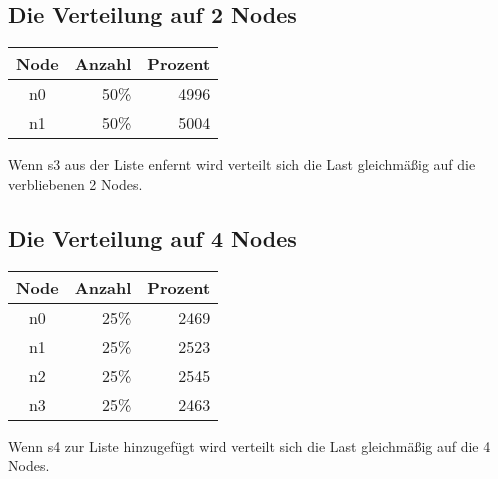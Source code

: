 \documentclass[12pt,a4paper]{report}
\begin{document}
		\subsection{Die Verteilung auf 2 Nodes}

		\begin{tabular}{|c|r|r|}
			Node & Anzahl & Prozent \\ \midrule
			n0 & 50\% & 4996 \\ \hline
			n1 & 50\% & 5004 \\ \hline
		\end{tabular}
		Wenn s3 aus der Liste enfernt wird verteilt sich die Last gleichmäßig auf die verbliebenen 2 Nodes.

		\subsection{Die Verteilung auf 4 Nodes}

		\begin{tabular}{|c|r|r|}
			Node & Anzahl & Prozent \\ \midrule
			n0 & 25\% & 2469 \\ \hline
			n1 & 25\% & 2523 \\ \hline
			n2 & 25\% & 2545 \\ \hline
			n3 & 25\% & 2463 \\ \hline
		\end{tabular}
		Wenn s4 zur Liste hinzugefügt wird verteilt sich die Last gleichmäßig auf die 4 Nodes.
\end{document}
